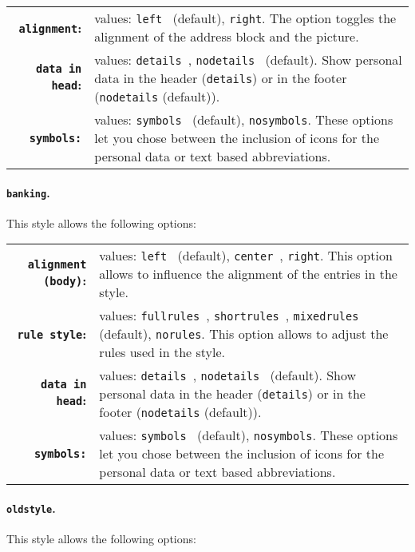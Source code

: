 \documentclass[a4paper,11pt]{article}
\newcommand{\code}[1]{\lstinline!#1!}
\newcommand{\Code}[1]{\lstinline!#1!~} %
\begin{document}
\begingroup
\renewcommand{\arraystretch}{1.1}
\begin{tabular}{r@{\hspace{2ex}}p{}}
 {\bfseries \code{alignment}:}  & values: \Code{left} (default), \code{right}. The option toggles the alignment of the address block and the picture.  \\
 {\bfseries \code{data in head}:} & values: \Code{details}, \Code{nodetails} (default). Show personal data in the header (\code{details}) or in the footer (\code{nodetails} (default)). \\
 {\bfseries \code{symbols:}}   & values: \Code{symbols} (default), \code{nosymbols}. These options let you chose between the inclusion of icons for the personal data or text based abbreviations. 
\end{tabular}\medskip
\endgroup

\paragraph{\texttt{banking}.} This style allows the following options:\medskip

\begingroup
\renewcommand{\arraystretch}{1.1}
\begin{tabular}{r@{\hspace{2ex}}p{}}
  {\bfseries \code{alignment (body)}:}  & values: \Code{left} (default), \Code{center}, \code{right}. This option allows to influence the alignment of the entries in the style.   \\
  {\bfseries \code{rule style}:}  & values: \Code{fullrules}, \Code{shortrules}, \Code{mixedrules} (default), \code{norules}. This option allows to adjust the rules used in the style.   \\
  {\bfseries \code{data in head}:} & values: \Code{details}, \Code{nodetails} (default). Show personal data in the header (\code{details}) or in the footer (\code{nodetails} (default)). \\
 {\bfseries \code{symbols:}}   & values: \Code{symbols} (default), \code{nosymbols}. These options let you chose between the inclusion of icons for the personal data or text based abbreviations. 
\end{tabular}\medskip
\endgroup

\paragraph{\texttt{oldstyle}.} This style allows the following options:\medskip
\end{document}
